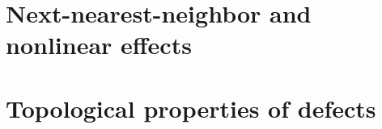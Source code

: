 \documentclass[12pt]{article}
\begin{document}
\pagebreak
\section{Next-nearest-neighbor and nonlinear effects}
\label{sec:higherorder}



\pagebreak
\section{Topological properties of defects}
\label{sec:top}
\end{document}

